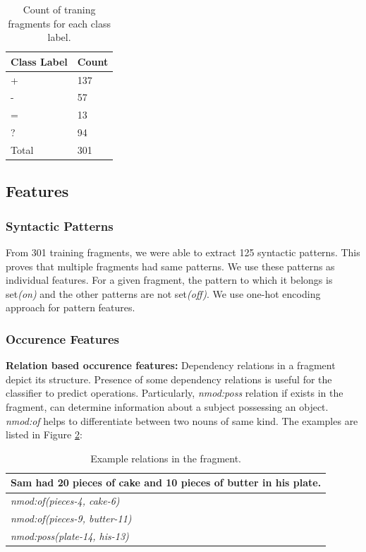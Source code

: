 \documentclass[11pt]{article}
\begin{document}
\begin{table}[h!]
\centering
\begin{tabular}{ | m{6em} | m{6em} |}
\hline
\textbf{Class Label} & \textbf{Count}\\
\hline
+ & 137\\
\hline
- & 57\\
\hline
= & 13\\
\hline
? & 94\\
\hline
Total & 301\\
\hline
\end{tabular}
\caption{Count of traning fragments for each class label.}
\label{fig:trainingdatadistribution}
\end{table}

\subsection {Features}\label{sec:features}

\subsubsection{Syntactic Patterns}\label{sec:featuressyntacticpattern}
From 301 training fragments, we were able to extract 125 syntactic patterns. This proves that multiple fragments had same patterns. We use these patterns as individual features. For a given fragment, the pattern to which it belongs is set\textit{(on)} and the other patterns are not set\textit{(off)}. We use one-hot encoding approach for pattern features.

\subsubsection{Occurence Features}\label{sec:featuresoccurence}

\textbf{Relation based occurence features:} Dependency relations in a fragment depict its structure. Presence of some dependency relations is useful for the classifier to predict operations. Particularly, \textit{nmod:poss} relation if exists in the fragment, can determine information about a subject possessing an object. \textit{nmod:of} helps to differentiate between two nouns of same kind. The examples are listed in Figure \ref{figure:15}:

\newpage
\begin{table}[h!]
\centering
\begin{tabular}{ | m{25em} | }
\hline
 \textbf{Sam had 20 pieces of cake and 10 pieces of butter in his plate.}\\
\hline
\textit{nmod:of(pieces-4, cake-6)}\\
\hline
\textit{nmod:of(pieces-9, butter-11)}\\
\hline
\textit{nmod:poss(plate-14, his-13)}\\
\hline
\end{tabular}
\caption{Example relations in the fragment.}
\label{figure:15}
\end{table}
\end{document}
